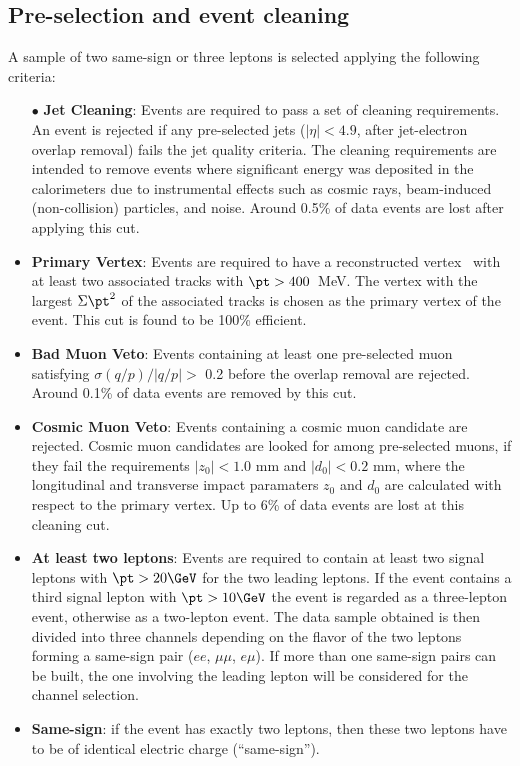 \subsection{Pre-selection and event cleaning}
\label{subsec:sec.strategy.selection_cleaning}

A sample of two same-sign or three leptons is selected applying the following criteria:
\begin{itemize}
\item[$\bullet$] \textbf{Jet Cleaning}: 
Events are required to pass a set of cleaning requirements. 
An event is rejected if any pre-selected jets ($|\eta|<4.9$, after 
jet-electron overlap removal) fails the jet quality criteria. 
The cleaning requirements are intended to remove events where significant 
energy was deposited in the calorimeters 
due to instrumental effects such as cosmic rays, beam-induced (non-collision) 
particles, and noise. Around 0.5\% of data events are lost after applying 
this cut.

\item \textbf{Primary Vertex}:
Events are required to have a reconstructed vertex~\cite{ATL-PHYS-PUB-2015-026} 
with at least two associated tracks with $\pt >400$~MeV. The vertex with the largest $\Sigma \pt^2$ of the associated tracks 
is chosen as the primary vertex of the event.
This cut is found to be 100\% efficient.

\item \textbf{Bad Muon Veto}: 
Events containing at least one pre-selected muon satisfying $\sigma(q/p)/|q/p| >$ 0.2 before the overlap removal are rejected. 
Around 0.1\% of data events are removed by this cut.

\item \textbf{Cosmic Muon Veto}: 
Events containing a cosmic muon candidate are rejected. 
Cosmic muon candidates are looked for among pre-selected muons, 
if they fail the requirements $|z_0| <1.0$ mm and $|d_0|<0.2$ mm, 
where the longitudinal and transverse impact paramaters $z_0$ and $d_0$ 
are calculated with respect to the primary vertex. 
Up to 6\% of data events are lost at this cleaning cut.

\item \textbf{At least two leptons}: 
Events are required to contain at least two signal leptons 
with $\pt>20 \GeV$ for the two leading leptons. 
If the event contains a third signal lepton with $\pt>10 \GeV$ the event is regarded as a three-lepton event, otherwise as a two-lepton event. 
The data sample obtained is then divided into three channels depending on the flavor of the two  leptons forming a same-sign pair ($ee$, $\mu\mu$, $e\mu$). 
If more than one same-sign pairs can be built, the one involving the leading 
lepton will be considered for the channel selection. 

\item \textbf{Same-sign}: 
if the event has exactly two leptons, then these two leptons
 have to be of identical electric charge (``same-sign'').
\end{itemize}

